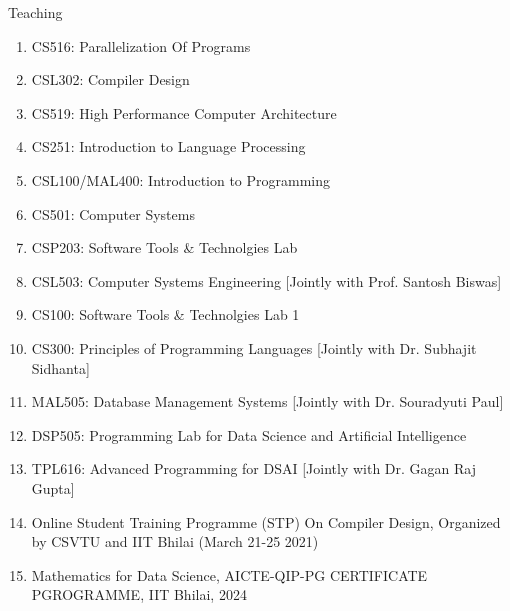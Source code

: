\documentclass{resume} %
\begin{document}
\begin{rSection}{Teaching}
	\begin{enumerate}
	\item CS516: Parallelization Of Programs
	\item CSL302: Compiler Design
	\item 	CS519: High Performance Computer Architecture
	\item 	CS251: Introduction to Language Processing
	\item 	CSL100/MAL400: Introduction to Programming
	\item 	CS501: Computer Systems
	\item 	CSP203: Software Tools \& Technolgies Lab
	\item 	CSL503: Computer Systems Engineering [Jointly with Prof. Santosh Biswas]
	\item 	CS100: Software Tools \& Technolgies Lab 1
	\item 	CS300: Principles of Programming Languages [Jointly with Dr. Subhajit Sidhanta]
	\item 	MAL505: Database Management Systems [Jointly with Dr. Souradyuti Paul]
	\item DSP505: Programming Lab for Data Science and Artificial Intelligence
	\item TPL616: Advanced Programming for DSAI [Jointly with Dr. Gagan Raj Gupta]
	\item 	Online Student Training Programme (STP) On Compiler Design, Organized by CSVTU and IIT Bhilai (March 21-25 2021)
	\item  Mathematics for Data Science, AICTE-QIP-PG CERTIFICATE PGROGRAMME, IIT Bhilai, 2024
	\end{enumerate}
\end{rSection}
\end{document}
